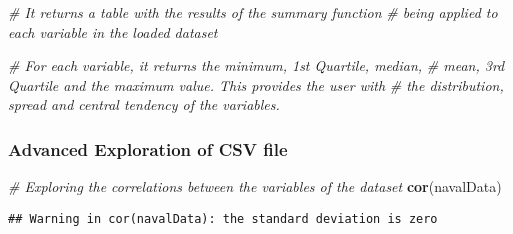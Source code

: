 \documentclass[
]{article}
\newenvironment{Shaded}{\begin{snugshade}}{\end{snugshade}}
\newcommand{\CommentTok}[1]{\textcolor[rgb]{0.56,0.35,0.01}{\textit{#1}}}
\newcommand{\KeywordTok}[1]{\textcolor[rgb]{0.13,0.29,0.53}{\textbf{#1}}}
\newcommand{\NormalTok}[1]{#1}
\begin{document}
\begin{Shaded}
\begin{Highlighting}[]
\CommentTok{# It returns a table with the results of the summary function}
\CommentTok{# being applied to each variable in the loaded dataset}

\CommentTok{# For each variable, it returns the minimum, 1st Quartile, median,}
\CommentTok{# mean, 3rd Quartile and the maximum value. This provides the user with}
\CommentTok{# the distribution, spread and central tendency of the variables.}
\end{Highlighting}
\end{Shaded}

\hypertarget{advanced-exploration-of-csv-file}{%
\subsubsection{Advanced Exploration of CSV
file}\label{advanced-exploration-of-csv-file}}

\begin{Shaded}
\begin{Highlighting}[]
\CommentTok{# Exploring the correlations between the variables of the dataset}
\KeywordTok{cor}\NormalTok{(navalData)}
\end{Highlighting}
\end{Shaded}

\begin{verbatim}
## Warning in cor(navalData): the standard deviation is zero
\end{verbatim}
\end{document}
